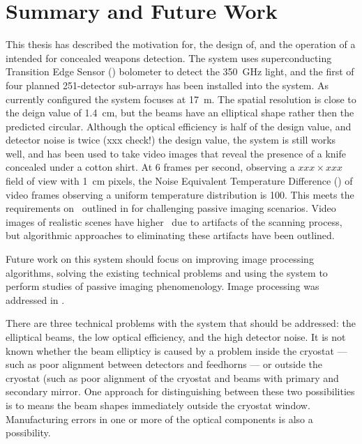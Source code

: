 \chapter{Summary and Future Work} \label{c:summary}

This thesis has described the motivation for, the design of, and the operation of a \Imager intended for concealed weapons detection.
The system uses superconducting Transition Edge Sensor (\TES) bolometer to detect the \SI{350}{\GHz} light, and the first of four planned 251-detector sub-arrays has been installed into the system.
As currently configured the system focuses at \SI{17}{\m}.
The spatial resolution is close to the deign value of \SI{1.4}{\cm}, but the beams have an elliptical shape rather then the predicted circular.
Although the optical efficiency is half of the design value, and detector noise is twice (xxx check!) the design value, the system is still works well, and has been used to take video images that reveal the presence of a knife concealed under a cotton shirt.
At 6 frames per second, observing a $xxx \times xxx$ field of view with \SI{1}{\cm} pixels, the Noise Equivalent Temperature Difference (\NETD) of video frames observing a uniform temperature distribution is \SI{100}{\mK}.
This meets the requirements on \NETD\ outlined in  for challenging passive imaging scenarios.
Video images of realistic scenes have higher \NETD\ due to artifacts of the scanning process, but algorithmic approaches to eliminating these artifacts have been outlined.

Future work on this system should focus on improving image processing algorithms, solving the existing technical problems and using the system to perform studies of passive imaging phenomenology.
Image processing was addressed in .

There are three technical problems with the system that should be addressed: the elliptical beams, the low optical efficiency, and the high detector noise.
It is not known whether the beam ellipticy is caused by a problem inside the cryostat --- such as poor alignment between detectors and feedhorns --- or outside the cryostat (such as poor alignment of the cryostat and beams with primary and secondary mirror.
One approach for distinguishing between these two possibilities is to means the beam shapes immediately outside the cryostat window.
Manufacturing errors in one or more of the optical components is also a possibility.

